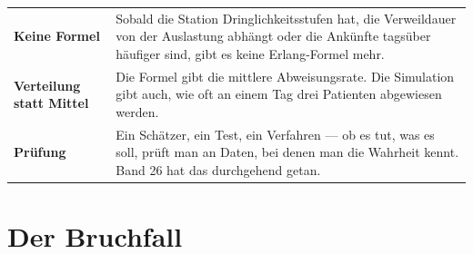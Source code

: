 \begin{merksatz}
\begin{center}
{\small
\renewcommand{\arraystretch}{1.55}
\begin{tabular}{@{}P{2.6cm}P{6.0cm}@{}}
\toprule
\textbf{Keine Formel} & Sobald die Station Dringlichkeitsstufen hat, die Verweildauer von der Auslastung abhängt oder die Ankünfte tagsüber häufiger sind, gibt es keine Erlang-Formel mehr.\\
\textbf{Verteilung statt Mittel} & Die Formel gibt die mittlere Abweisungsrate. Die Simulation gibt auch, wie oft an einem Tag drei Patienten abgewiesen werden.\\
\textbf{Prüfung} & Ein Schätzer, ein Test, ein Verfahren --- ob es tut, was es soll, prüft man an Daten, bei denen man die Wahrheit kennt. Band 26 hat das durchgehend getan.\\
\bottomrule
\end{tabular}}
\end{center}

\begin{center}
\begin{minipage}{0.88\textwidth}
\end{minipage}
\end{center}
\end{merksatz}

\section{Der Bruchfall}

